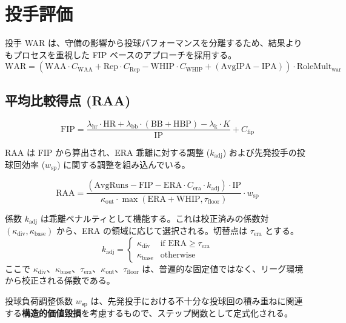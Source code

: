 \documentclass[uplatex,a4paper,11pt,dvipdfmx]{jsarticle}
\newcommand{\mvar}[1]{\mathrm{#1}}
\begin{document}
\section{投手評価}
投手 WAR は、守備の影響から投球パフォーマンスを分離するため、結果よりもプロセスを重視した FIP ベースのアプローチを採用する。
\begin{equation}
\mvar{WAR} = (\mvar{WAA} \cdot C_{\text{WAA}} + \mvar{Rep} \cdot C_{\text{Rep}} - \mvar{WHIP} \cdot C_{\text{WHIP}} + (\mvar{AvgIPA} - \mvar{IPA})) \cdot \mvar{RoleMult}_{\text{war}}
\end{equation}

\subsection{平均比較得点 (RAA)}
\begin{equation}
\mvar{FIP} = \frac{\lambda_{\text{hr}} \cdot \mvar{HR} + \lambda_{\text{bb}} \cdot (\mvar{BB} + \mvar{HBP}) - \lambda_{\text{k}} \cdot K}{\mvar{IP}} + C_{\text{fip}}
\end{equation}

RAA は FIP から算出され、ERA 乖離に対する調整 ($k_{\text{adj}}$) および先発投手の投球回効率 ($w_{\text{sp}}$) に関する調整を組み込んでいる。

\begin{equation}
\mvar{RAA} = \frac{(\mvar{AvgRuns} - \mvar{FIP} - \mvar{ERA} \cdot C_{\text{era}} \cdot k_{\text{adj}}) \cdot \mvar{IP}}{\kappa_{\text{out}} \cdot \max(\mvar{ERA} + \mvar{WHIP}, \tau_{\text{floor}})} \cdot w_{\text{sp}}
\end{equation}

係数 $k_{\text{adj}}$ は乖離ペナルティとして機能する。これは校正済みの係数対 $(\kappa_{\text{div}}, \kappa_{\text{base}})$ から、ERA の領域に応じて選択される。切替点は $\tau_{\text{era}}$ とする。
\begin{equation}
k_{\text{adj}} = \begin{cases}
\kappa_{\text{div}} & \text{if } \mvar{ERA} \ge \tau_{\text{era}} \\
\kappa_{\text{base}} & \text{otherwise}
\end{cases}
\end{equation}
ここで $\kappa_{\text{div}}$、$\kappa_{\text{base}}$、$\tau_{\text{era}}$、$\kappa_{\text{out}}$、$\tau_{\text{floor}}$ は、普遍的な固定値ではなく、リーグ環境から校正される係数である。

投球負荷調整係数 $w_{\text{sp}}$ は、先発投手における不十分な投球回の積み重ねに関連する\textbf{構造的価値毀損}を考慮するもので、ステップ関数として定式化される。
\end{document}
